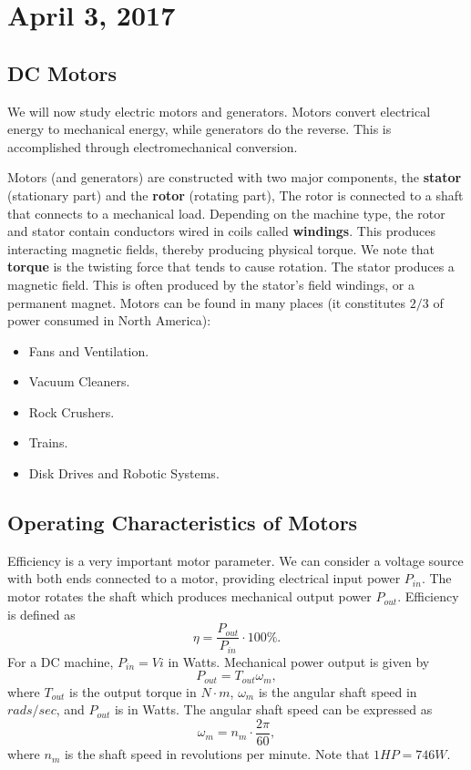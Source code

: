 \documentclass[11pt]{article}
\theoremstyle{plain} %
\theoremstyle{definition}
\theoremstyle{example}
\theoremstyle{remark}
\begin{document}
\section{April 3, 2017}
\subsection{DC Motors}
We will now study electric motors and generators. Motors convert electrical energy to mechanical energy, while generators do the reverse. This is accomplished through electromechanical conversion. 

Motors (and generators) are constructed with two major components, the \textbf{stator} (stationary part) and the \textbf{rotor} (rotating part), The rotor is connected to a shaft that connects to a mechanical load. Depending on the machine type, the rotor and stator contain conductors wired in coils called \textbf{windings}. This produces interacting magnetic fields, thereby producing physical torque.  We note that \textbf{torque} is the twisting force that tends to cause rotation. The stator produces a magnetic field. This is often produced by the stator's field windings, or a permanent magnet. Motors can be found in many places (it constitutes $2/3$ of power consumed in North America):
\begin{itemize}
	\item Fans and Ventilation.
	\item Vacuum Cleaners.
	\item Rock Crushers.
	\item Trains.
	\item Disk Drives and Robotic Systems.
\end{itemize}

\subsection{Operating Characteristics of Motors}
Efficiency is a very important motor parameter. We can consider a voltage source with both ends connected to a motor, providing electrical input power $P_{in}$. The motor rotates the shaft which produces mechanical output power $P_{out}$. Efficiency is defined as 
$$\eta = \frac{P_{out}}{P_{in}}\cdot 100\%.$$
For a DC machine, $P_{in} = Vi$ in Watts. Mechanical power output is given by 
$$P_{out} = T_{out}\omega_m,$$
where $T_{out}$ is the output torque in $N\cdot m$, $\omega_m$ is the angular shaft speed in $rads/sec$, and $P_{out}$ is in Watts. The angular shaft speed can be expressed as 
$$\omega _m = n_m \cdot \frac{2\pi}{60},$$
where $n_m$ is the shaft speed in revolutions per minute. Note that $1HP = 746W$. 
\end{document}
